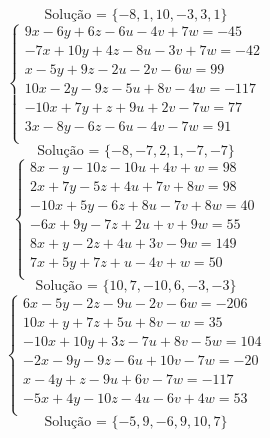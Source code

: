 \documentclass[12pt,oneside,a4paper]{article}
\begin{document}
\begin{equation*}
\text{Solução = }\{-8,1,10,-3,3,1\}
\end{equation*}
\vspace{\baselineskip}
\begin{equation*}
\begin{cases}
9x-6y+6z-6u-4v+7w=-45 \\
-7x+10y+4z-8u-3v+7w=-42 \\
x-5y+9z-2u-2v-6w=99 \\
10x-2y-9z-5u+8v-4w=-117 \\
-10x+7y+z+9u+2v-7w=77 \\
3x-8y-6z-6u-4v-7w=91 \\
\end{cases}
\end{equation*}
\begin{equation*}
\text{Solução = }\{-8,-7,2,1,-7,-7\}
\end{equation*}
\vspace{\baselineskip}
\begin{equation*}
\begin{cases}
8x-y-10z-10u+4v+w=98 \\
2x+7y-5z+4u+7v+8w=98 \\
-10x+5y-6z+8u-7v+8w=40 \\
-6x+9y-7z+2u+v+9w=55 \\
8x+y-2z+4u+3v-9w=149 \\
7x+5y+7z+u-4v+w=50 \\
\end{cases}
\end{equation*}
\begin{equation*}
\text{Solução = }\{10,7,-10,6,-3,-3\}
\end{equation*}
\vspace{\baselineskip}
\begin{equation*}
\begin{cases}
6x-5y-2z-9u-2v-6w=-206 \\
10x+y+7z+5u+8v-w=35 \\
-10x+10y+3z-7u+8v-5w=104 \\
-2x-9y-9z-6u+10v-7w=-20 \\
x-4y+z-9u+6v-7w=-117 \\
-5x+4y-10z-4u-6v+4w=53 \\
\end{cases}
\end{equation*}
\begin{equation*}
\text{Solução = }\{-5,9,-6,9,10,7\}
\end{equation*}
\end{document}
